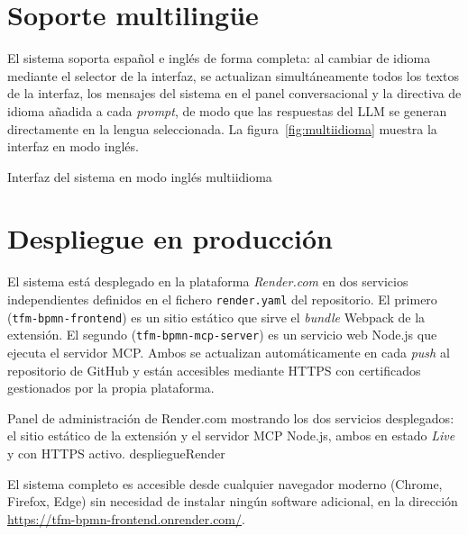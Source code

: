 \section{Soporte multilingüe}
\label{sec:demoMultiidioma}
El sistema soporta español e inglés de forma completa: al cambiar de idioma mediante el selector de la interfaz, se actualizan simultáneamente todos los textos de la interfaz, los mensajes del sistema en el panel conversacional y la directiva de idioma añadida a cada \textit{prompt}, de modo que las respuestas del LLM se generan directamente en la lengua seleccionada. La figura~\ref{fig:multiidioma} muestra la interfaz en modo inglés.

%
  {Interfaz del sistema en modo inglés}%
  {multiidioma}

\section{Despliegue en producción}
\label{sec:demoDespliegue}

El sistema está desplegado en la plataforma \textit{Render.com} en dos servicios independientes definidos en el fichero \texttt{render.yaml} del repositorio. El primero (\texttt{tfm-bpmn-frontend}) es un sitio estático que sirve el \textit{bundle} Webpack de la extensión. El segundo (\texttt{tfm-bpmn-mcp-server}) es un servicio web Node.js que ejecuta el servidor MCP. Ambos se actualizan automáticamente en cada \textit{push} al repositorio de GitHub y están accesibles mediante HTTPS con certificados gestionados por la propia plataforma.

%
  {Panel de administración de Render.com mostrando los dos servicios desplegados: el sitio estático de la extensión y el servidor MCP Node.js, ambos en estado \textit{Live} y con HTTPS activo.}%
  {despliegueRender}

El sistema completo es accesible desde cualquier navegador moderno (Chrome, Firefox, Edge) sin necesidad de instalar ningún software adicional, en la dirección \url{https://tfm-bpmn-frontend.onrender.com/}.

